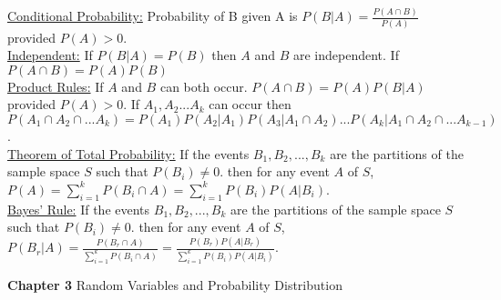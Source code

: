 \documentclass[9pt]{article}
\begin{document}
\begin{multicols}{2}
            \underline{Conditional Probability:} Probability of B given A is $P(B|A)=\frac{P(A\cap B)}{P(A)}$ provided $P(A) > 0$.\\
            \underline{Independent:} If $P(B|A) = P(B)$ then $A$ and $B$ are independent. If $P(A\cap B)=P(A)P(B)$\\
            \underline{Product Rules:} If $A$ and $B$ can both occur. $P(A\cap B) = P(A)P(B|A)$ provided $P(A)>0$. If $A_1,A_2...A_k$ can occur then $P(A_1\cap A_2\cap ... A_k) = P(A_1)P(A_2|A_1)P(A_3|A_1\cap A_2)...P(A_k|A_1\cap A_2\cap ... A_{k-1})$.\\
            \underline{Theorem of Total Probability:} If the events $B_1, B_2,...,B_k$ are the partitions of the sample space $S$ such that $P(B_i)\not= 0$. then for any event $A$ of $S$, $P(A)=\sum_{i=1}^{k}P(B_i\cap A)=\sum_{i=1}^{k}P(B_i)P(A|B_i)$.\\
            \underline{Bayes' Rule:} If the events $B_1, B_2,...,B_k$ are the partitions of the sample space $S$ such that $P(B_i)\not= 0$. then for any event $A$ of $S$, $P(B_r|A) = \frac{P(B_r\cap A)}{\sum_{i=1}^{k}P(B_i\cap A)} = \frac{P(B_r)P(A|B_r)}{\sum_{i=1}^{k}P(B_i)P(A|B_i)}$.\\
        \end{multicols}
    \noindent\textbf{Chapter 3} Random Variables and Probability Distribution
\end{document}
